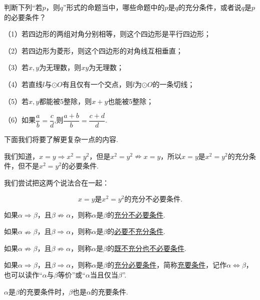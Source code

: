 \documentclass[lang=cn,math=cm,chinesefont=nofont,11pt,scheme=chinese,twocol]{elegantbook}
\begin{document}
\begin{exercise}\label{202406262101}
  判断下列“若$p$，则$q$”形式的命题当中，哪些命题中的$p$是$q$的充分条件，或者说$q$是$p$的必要条件？

  （1）若四边形的两组对角分别相等，则这个四边形是平行四边形；

  （2）若四边形为菱形，则这个四边形的对角线互相垂直；

  （3）若$x,y$为无理数，则$xy$为无理数；

  （4）若直线$l$与$\odot O$有且仅有一个交点，则$l$为$\odot O$的一条切线；

  （5）若$x,y$都能被5整除，则$x+y$也能被5整除；

  \begin{spacing}{2.0}
    （6）如果$\dfrac{a}{b}=\dfrac{c}{d}$,则$\dfrac{a+b}{b}=\dfrac{c+d}{d}$.
  \end{spacing}
\end{exercise}

\hspace*{\fill}

下面我们将要了解更复杂一点的内容.

我们知道，$x=y\Rightarrow x^2=y^2$，但是$x^2=y^2\nRightarrow x=y$，所以$x=y$是$x^2=y^2$的充分条件，但不是$x^2=y^2$的必要条件.

我们尝试把这两个说法合在一起：

$$x=y\text{是}x^2=y^2\text{的}\textbf{充分不必要条件.}$$

\begin{definition}
  如果$\alpha\Rightarrow\beta$，且$\beta\nRightarrow\alpha$，则称$\alpha$是$\beta$的\underline{充分不必要条件}.

  如果$\alpha\nRightarrow\beta$，且$\beta\Rightarrow\alpha$，则称$\alpha$是$\beta$的\underline{必要不充分条件}.

  如果$\alpha\nRightarrow\beta$，且$\beta\nRightarrow\alpha$，则称$\alpha$是$\beta$的\underline{既不充分也不必要条件}.

  如果$\alpha\Rightarrow\beta$，且$\beta\Rightarrow\alpha$，则称$\alpha$是$\beta$的\underline{充分必要条件}，简称\underline{充要条件}，记作$\alpha\Leftrightarrow\beta$，也可以读作“$\alpha$与$\beta$等价”或“$\alpha$当且仅当$\beta$”.
\end{definition}

\begin{remark}
  $\alpha$是$\beta$的充要条件时，$\beta$也是$\alpha$的充要条件.
\end{remark}

\hspace*{\fill}
\end{document}
